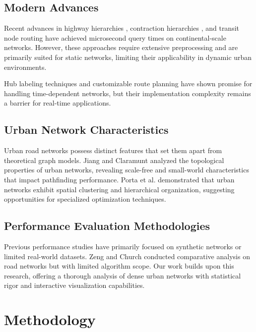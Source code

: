 \documentclass[conference]{IEEEtran}
\begin{document}
\subsection{Modern Advances}

Recent advances in highway hierarchies \cite{sanders2005highway}, contraction hierarchies \cite{geisberger2008contraction}, and transit node routing \cite{bast2007fast} have achieved microsecond query times on continental-scale networks. However, these approaches require extensive preprocessing and are primarily suited for static networks, limiting their applicability in dynamic urban environments.

Hub labeling techniques \cite{abraham2011hub} and customizable route planning \cite{dibbelt2016customizable} have shown promise for handling time-dependent networks, but their implementation complexity remains a barrier for real-time applications.

\subsection{Urban Network Characteristics}

Urban road networks possess distinct features that set them apart from theoretical graph models. Jiang and Claramunt \cite{jiang2004topological} analyzed the topological properties of urban networks, revealing scale-free and small-world characteristics that impact pathfinding performance. Porta et al. \cite{porta2006network} demonstrated that urban networks exhibit spatial clustering and hierarchical organization, suggesting opportunities for specialized optimization techniques.

\subsection{Performance Evaluation Methodologies}

Previous performance studies have primarily focused on synthetic networks or limited real-world datasets. Zeng and Church \cite{zeng2012comparative} conducted comparative analysis on road networks but with limited algorithm scope. Our work builds upon this research, offering a thorough analysis of dense urban networks with statistical rigor and interactive visualization capabilities.

\section{Methodology}
\end{document}
